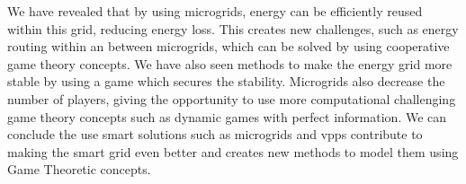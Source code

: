 We have revealed that by using microgrids, energy can be efficiently reused within this grid, reducing energy loss. This creates new challenges, such as energy routing within an between microgrids, which can be solved by using cooperative game theory concepts. We have also seen methods to make the energy grid more stable by using a game which secures the stability.
Microgrids also decrease the number of players, giving the opportunity to use more computational challenging game theory concepts such as dynamic games with perfect information.
We can conclude the use smart solutions such as microgrids and \acp{vpp} contribute to making the smart grid even better and creates new methods to model them using Game Theoretic concepts.
